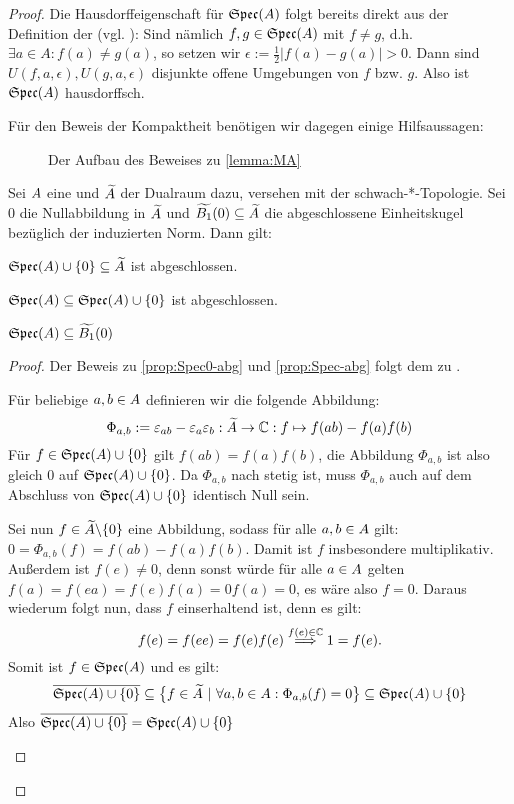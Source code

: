 \begin{proof}
Die Hausdorffeigenschaft für $\mathfrak{Spec}(A)$ folgt bereits direkt aus der Definition der \ssTop{} (vgl. \cite[Lemma 2.1.27 b)]{Baer2003}): Sind nämlich $f, g \in \mathfrak{Spec}(A)$ mit $f \neq g$, d.h. $\exists a\in A: f(a) \neq g(a)$, so setzen wir $\epsilon := \frac{1}{2} |f(a) - g(a)| > 0$. Dann sind $U(f, a, \epsilon), U(g, a, \epsilon)$ disjunkte offene Umgebungen von $f$ bzw. $g$. Also ist $\mathfrak{Spec}(A)$ hausdorffsch.

Für den Beweis der Kompaktheit benötigen wir dagegen einige Hilfsaussagen:

\begin{figure}[h]
	
	\caption{Der Aufbau des Beweises zu \cref*{lemma:MA}}
\end{figure}


\begin{prop}
Sei $A$ eine \CAlg{} und $\widetilde{A}$ der Dualraum dazu, versehen mit der schwach-*-Topologie. Sei $0$ die Nullabbildung in $\widetilde{A}$ und $\widetilde{B_1}(0) \subseteq \widetilde{A}$ die abgeschlossene Einheitskugel bezüglich der induzierten Norm. Dann gilt:
\begin{propenum}
	\item $\mathfrak{Spec}(A) \cup \{0\} \subseteq \widetilde{A}$ ist abgeschlossen. 		\label{prop:Spec0-abg} 
	\item $\mathfrak{Spec}(A) \subseteq \mathfrak{Spec}(A) \cup \{0\}$ ist abgeschlossen.		\label{prop:Spec-abg} 
	\item $\mathfrak{Spec}(A) \subseteq \widetilde{B_1}(0)$							\label{prop:Spec-in-B0} 
\end{propenum}
\end{prop}

\begin{proof}Der Beweis zu \ref*{prop:Spec0-abg} und \ref*{prop:Spec-abg} folgt dem zu \cite[Lemma 2.1.27 a), d)]{Baer2003}.
\begin{proofenum} 
	\item %
	Für beliebige $a, b \in A$ definieren wir die folgende Abbildung:
	\[\Phi_{a,b} := \varepsilon_{ab}-\varepsilon_a \varepsilon_b : \widetilde{A} \to \mathbb{C}: f \mapsto f(ab)-f(a)f(b)\]
	Für $f \in \mathfrak{Spec}(A) \cup \{0\}$ gilt $f(ab) = f(a)f(b)$, die Abbildung $\Phi_{a,b}$ ist also gleich 0 auf $\mathfrak{Spec}(A) \cup \{0\}$. Da $\Phi_{a,b}$ nach  stetig ist, muss $\Phi_{a,b}$ auch auf dem Abschluss von $\mathfrak{Spec}(A) \cup \{0\}$ identisch Null sein. 
	
Sei nun $f \in \widetilde{A} \backslash \{0\}$ eine Abbildung, sodass für alle $a, b \in A$ gilt: $0 = \Phi_{a,b}(f) = f(ab) - f(a)f(b)$. Damit ist $f$ insbesondere multiplikativ. Außerdem ist $f(e) \neq 0$, denn sonst würde für alle $a \in A$ gelten $f(a) = f(ea) = f(e)f(a) = 0f(a) = 0$, es wäre also $f = 0$. Daraus wiederum folgt nun, dass $f$ einserhaltend ist, denn es gilt:
	\[f(e) = f(ee) = f(e)f(e) \overset{f(e) \in \mathbb{C}}{\Longrightarrow} 1 = f(e).\]
Somit ist $f \in \mathfrak{Spec}(A)$ und es gilt:
	\[\overline{\mathfrak{Spec}(A) \cup \{0\}} \subseteq \big\{f \in \widetilde{A} ~|~ \forall a,b \in A: \Phi_{a,b}(f) = 0 \big\} \subseteq \mathfrak{Spec}(A) \cup \{0\} \]
	Also $\overline{\mathfrak{Spec}(A) \cup \{0\}} = \mathfrak{Spec}(A) \cup \{0\}$
	

\end{proofenum}
\end{proof}
\end{proof}
